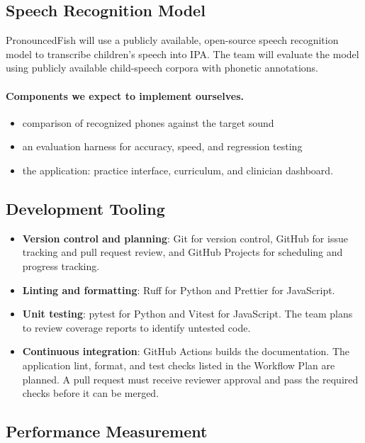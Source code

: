 \documentclass{article}
\begin{document}
\subsection{Speech Recognition Model}

PronouncedFish will use a publicly available, open-source speech recognition
model to transcribe children's speech into IPA. The team will evaluate the
model using publicly available child-speech corpora with phonetic
annotations.

\paragraph{Components we expect to implement ourselves.}
\begin{itemize}
\item comparison of recognized phones against the target sound
\item an evaluation harness for accuracy, speed, and regression testing
\item the application: practice interface, curriculum, and clinician dashboard.
\end{itemize}

\subsection{Development Tooling}

\begin{itemize}
\item \textbf{Version control and planning}: Git for version control, GitHub
  for issue tracking and pull request review, and GitHub Projects for
  scheduling and progress tracking.
\item \textbf{Linting and formatting}: Ruff for Python and Prettier for
  JavaScript.
\item \textbf{Unit testing}: pytest for Python and Vitest for JavaScript.
  The team plans to review coverage reports to identify untested code.
\item \textbf{Continuous integration}: GitHub Actions builds the
  documentation. The application lint, format, and test checks listed in
  the Workflow Plan are planned. A pull request must receive reviewer
  approval and pass the required checks before it can be merged.
\end{itemize}

\subsection{Performance Measurement}
\end{document}
